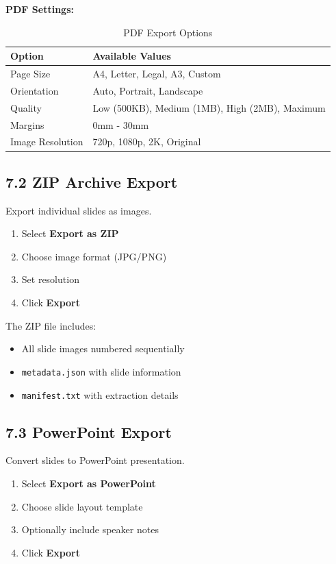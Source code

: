 \documentclass[12pt,a4paper]{article}
\newcommand{\subsectionTitle}[1]{\subsection*{#1}}
\newcommand{\code}[1]{\texttt{#1}}
\begin{document}
\textbf{PDF Settings:}

\begin{table}[H]
    \centering
    \caption{PDF Export Options}
    \begin{tabular}{ll}
        \toprule
        \textbf{Option} & \textbf{Available Values} \\
        \midrule
        Page Size & A4, Letter, Legal, A3, Custom \\
        Orientation & Auto, Portrait, Landscape \\
        Quality & Low (500KB), Medium (1MB), High (2MB), Maximum \\
        Margins & 0mm - 30mm \\
        Image Resolution & 720p, 1080p, 2K, Original \\
        \bottomrule
    \end{tabular}
\end{table}

\subsectionTitle{7.2 ZIP Archive Export}

Export individual slides as images.

\begin{enumerate}
    \item Select \textbf{Export as ZIP}
    \item Choose image format (JPG/PNG)
    \item Set resolution
    \item Click \textbf{Export}
\end{enumerate}

The ZIP file includes:
\begin{itemize}
    \item All slide images numbered sequentially
    \item \code{metadata.json} with slide information
    \item \code{manifest.txt} with extraction details
\end{itemize}

\subsectionTitle{7.3 PowerPoint Export}

Convert slides to PowerPoint presentation.

\begin{enumerate}
    \item Select \textbf{Export as PowerPoint}
    \item Choose slide layout template
    \item Optionally include speaker notes
    \item Click \textbf{Export}
\end{enumerate}
\end{document}
